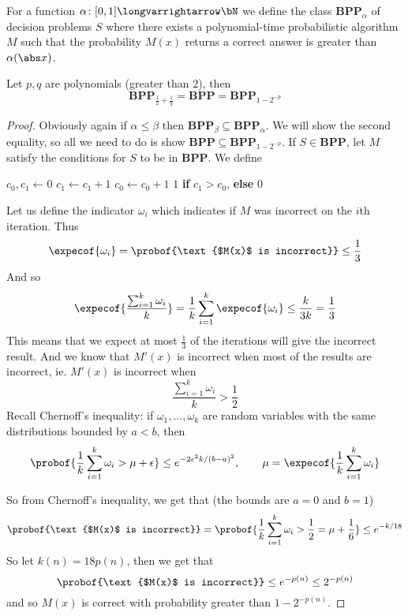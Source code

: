 \documentclass[10pt]{article}
\let\longto=\longvarrightarrow
\def\BPP{\mathbf{BPP}}
\begin{document}
\begin{defn*}

    For a function $\alpha\colon[0,1]\longto\bN$ we define the class $\BPP_\alpha$ of decision problems $S$ where there exists a polynomial-time probabilistic algorithm $M$ such that the probability $M(x)$
    returns a correct answer is greater than $\alpha(\abs x)$.

\end{defn*}

\begin{thrm*}

    Let $p,q$ are polynomials (greater than $2$), then
    \[ \BPP_{\frac12+\frac1q} = \BPP = \BPP_{1-2^{-p}} \]

\end{thrm*}

\begin{proof}

    Obviously again if $\alpha\leq\beta$ then $\BPP_\beta\subseteq\BPP_\alpha$.
    We will show the second equality, so all we need to do is show $\BPP\subseteq\BPP_{1-2^{-p}}$.
    If $S\in\BPP$, let $M$ satisfy the conditions for $S$ to be in $\BPP$.
    We define

    \algorithm
            \State $c_0,c_1\gets 0$
                 $c_1\gets c_1+1$
                \lElse $c_0\gets c_0+1$
            \EndRepeat
            \State\Return $1$ \textbf{if} $c_1>c_0$, \textbf{else} $0$
        \EndFunc
    \ealgorithm

    Let us define the indicator $\omega_i$ which indicates if $M$ was incorrect on the $i$th iteration.
    Thus
    \[ \expecof{\omega_i} = \probof{\text{$M(x)$ is incorrect}} \leq \frac13 \]
    And so
    \[ \expecof{\frac{\sum_{i=1}^k\omega_i}k} = \frac1k\sum_{i=1}^k\expecof{\omega_i} \leq \frac k{3k} = \frac13 \]
    This means that we expect at most $\frac13$ of the iterations will give the incorrect result.
    And we know that $M'(x)$ is incorrect when most of the results are incorrect, ie. $M'(x)$ is incorrect when
    \[ \frac{\sum_{i=1}^k\omega_i}k > \frac12 \]
    Recall Chernoff's inequality: if $\omega_1,\dots,\omega_k$ are random variables with the same distributions bounded by $a<b$, then
    \[ \probof{\frac1k\sum_{i=1}^k\omega_i > \mu + \epsilon} \leq e^{-2\epsilon^2k/(b-a)^2},\qquad \mu=\expecof{\frac1k\sum_{i=1}^k\omega_i} \]

    So from Chernoff's inequality, we get that (the bounds are $a=0$ and $b=1$)
    \[ \probof{\text{$M(x)$ is incorrect}} = \probof{\frac1k\sum_{i=1}^k\omega_i > \frac12 = \mu + \frac16} \leq e^{-k/18} \]
    So let $k(n)=18p(n)$, then we get that
    \[ \probof{\text{$M(x)$ is incorrect}} \leq e^{-p(n)} \leq 2^{-p(n)} \]
    and so $M(x)$ is correct with probability greater than $1-2^{-p(n)}$.


\end{proof}
\end{document}
